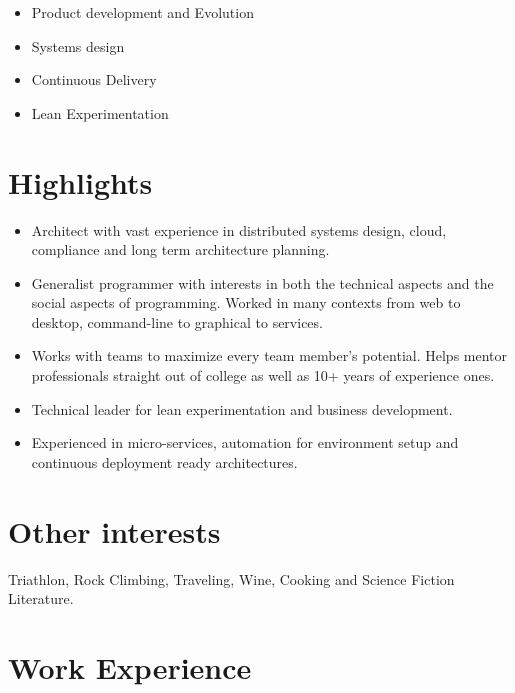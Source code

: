 \documentclass[letter,10pt]{article}
\begin{document}
\begin{itemize}
\item Product development and Evolution
\item Systems design
\item Continuous Delivery
\item Lean Experimentation
\end{itemize}

\section{Highlights}

\begin{itemize}
\item Architect with vast experience in distributed systems design, cloud, compliance and long term architecture planning.
\item Generalist programmer with interests in both the technical
  aspects and the social aspects of programming. Worked in many contexts from web to desktop, command-line to graphical to services.
\item Works with teams to maximize every team member's potential. Helps mentor professionals straight out of college as well as 10+ years of experience ones.
\item Technical leader for lean experimentation and business development.
\item Experienced in micro-services, automation for environment setup and continuous deployment ready architectures.
\end{itemize}

\section{Other interests}

Triathlon, Rock Climbing, Traveling, Wine, Cooking and Science Fiction Literature.

\section{Work Experience}
\end{document}
